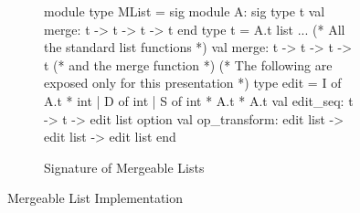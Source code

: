 \begin{figure}

\begin{subfigure}[b]{0.7\textwidth}
\begin{ocaml}
module type MList = sig
  module A: sig
    type t
    val merge: t -> t -> t -> t
  end
  type t = A.t list
  ... (* All the standard list functions *)
  val merge: t -> t -> t -> t (* and the merge function *)
  (* The following are exposed only for this presentation *)
  type edit =
      I of A.t * int
    | D of int
    | S of int * A.t * A.t
  val edit_seq: t -> t -> edit list option
  val op_transform: edit list -> edit list -> edit list
end
\end{ocaml}
\caption{Signature of Mergeable Lists}
\label{fig:mlist-sig}
\end{subfigure}


\caption{Mergeable List Implementation}
\label{fig:mlist}
\end{figure}
